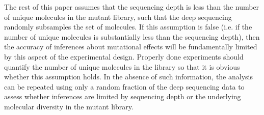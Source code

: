 \documentclass[twocolumn]{bmcart}%
\begin{document}
The rest of this paper assumes that the sequencing depth is less than the number of unique molecules in the mutant library, such that the deep sequencing randomly subsamples the set of molecules. If this assumption is false (i.e. if the number of unique molecules is substantially less than the sequencing depth), then the accuracy of inferences about mutational effects will be fundamentally limited by this aspect of the experimental design. Properly done experiments should quantify the number of unique molecules in the library so that it is obvious whether this assumption holds. In the absence of such information, the analysis can be repeated using only a random fraction of the deep sequencing data to assess whether inferences are limited by sequencing depth or the underlying molecular diversity in the mutant library.
\end{document}
